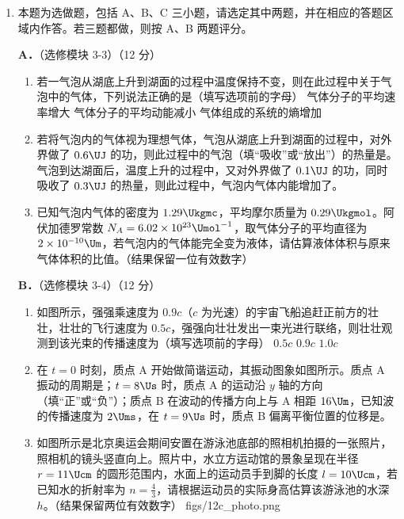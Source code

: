 \documentclass[\gkver]{gaokaozhenti}
\begin{document}
\begin{enumerate}
\item
本题为选做题，包括 A、B、C 三小题，请选定其中两题，并在相应的答题区域内作答。若三题都做，则按 A、B 两题评分。

\textbf{A．}（选修模块 3-3）（12 分）

\begin{enumerate}
	\item
	若一气泡从湖底上升到湖面的过程中温度保持不变，则在此过程中关于气泡中的气体，下列说法正确的是（填写选项前的字母）
	{气体分子的平均速率增大}
	{气体分子的平均动能减小}
	{气体组成的系统的熵增加}
	\item
	若将气泡内的气体视为理想气体，气泡从湖底上升到湖面的过程中，对外界做了 $0.6\UJ$ 的功，则此过程中的气泡（填“吸收”或“放出”）的热量是\tkanswer[1.4cm]{$0.6\UJ$}。气泡到达湖面后，温度上升的过程中，又对外界做了 $0.1\UJ$ 的功，同时吸收了 $0.3\UJ$ 的热量，则此过程中，气泡内气体内能增加了\tkanswer[1.4cm]{$0.2\UJ$}。
	\item
	已知气泡内气体的密度为 $1.29\Ukgmc$，平均摩尔质量为 $0.29\Ukgmol$。阿伏加德罗常数 $N_{A}=6.02\times10^{23}\Umol^{-1}$，取气体分子的平均直径为 $2\times10^{-10}\Um$，若气泡内的气体能完全变为液体，请估算液体体积与原来气体体积的比值。（结果保留一位有效数字）
\end{enumerate}

\textbf{B．}（选修模块 3-4）（12 分）

\begin{enumerate}
	\item
	如图所示，强强乘速度为 $0.9c$（$c$ 为光速）的宇宙飞船追赶正前方的壮壮，壮壮的飞行速度为 $0.5c$，强强向壮壮发出一束光进行联络，则壮壮观测到该光束的传播速度为（填写选项前的字母）
	{$0.5c$}
	{$0.9c$}
	{$1.0c$}
	\item
	在 $t=0$ 时刻，质点 A 开始做简谐运动，其振动图象如图所示。质点 A 振动的周期是\tkanswer[1.0cm]{$4\Us$}；$t=8\Us$ 时，质点 A 的运动沿 $y$ 轴的方向（填“正”或“负”）；质点 B 在波动的传播方向上与 A 相距 $16\Um$，已知波的传播速度为 $2\Ums$，在 $t=9\Us$ 时，质点 B 偏离平衡位置的位移是\tkanswer[1.2cm]{$10\Ucm$}。
	\item
	如图所示是北京奥运会期间安置在游泳池底部的照相机拍摄的一张照片，照相机的镜头竖直向上。照片中，水立方运动馆的景象呈现在半径 $r=11\Ucm$ 的圆形范围内，水面上的运动员手到脚的长度 $l=10\Ucm$，若已知水的折射率为 $n=\frac{4}{3}$，请根据运动员的实际身高估算该游泳池的水深 $h$。（结果保留两位有效数字）
	{figs/12c_photo.png}
\end{enumerate}


\end{enumerate}
\end{document}
